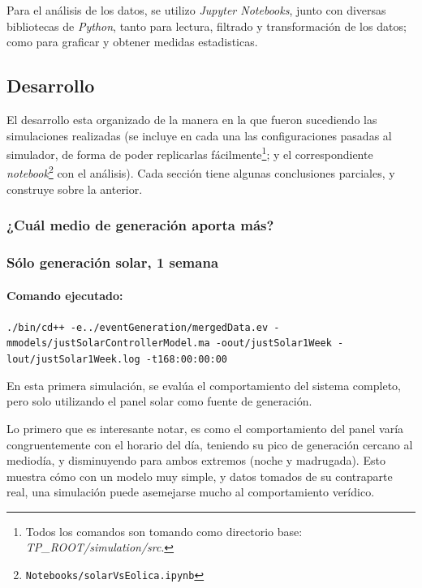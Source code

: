 Para el análisis de los datos, se utilizo \textit{Jupyter Notebooks}, junto
con diversas bibliotecas de \textit{Python}, tanto para lectura, filtrado y
transformación de los datos; como para graficar y obtener medidas
estadisticas.

\pagebreak
\subsection{Desarrollo}
El desarrollo esta organizado de la manera en la que fueron sucediendo las
simulaciones realizadas (se incluye en cada una las configuraciones pasadas
al simulador, de forma de poder replicarlas fácilmente\footnote{Todos los
comandos son tomando como directorio base:
\textit{TP\_ROOT/simulation/src}.}; y el correspondiente \textit{notebook}\footnote{\texttt{Notebooks/solarVsEolica.ipynb}}
con el análisis). Cada sección tiene algunas conclusiones parciales, y
construye sobre la anterior.

\subsubsection{¿Cuál medio de generación aporta más?}

    \hypertarget{suxf3lo-generaciuxf3n-solar-1-semana}{%
\subsubsection{Sólo generación solar, 1
semana}\label{suxf3lo-generaciuxf3n-solar-1-semana}}

\hypertarget{comando-ejecutado}{%
\paragraph{Comando ejecutado:}\label{comando-ejecutado}}

\texttt{./bin/cd++ -e../eventGeneration/mergedData.ev
-mmodels/justSolarControllerModel.ma -oout/justSolar1Week
-lout/justSolar1Week.log -t168:00:00:00}

    En esta primera simulación, se evalúa el comportamiento del sistema
completo, pero solo utilizando el panel solar como fuente de generación.

Lo primero que es interesante notar, es como el comportamiento del panel
varía congruentemente con el horario del día, teniendo su pico de
generación cercano al mediodía, y disminuyendo para ambos extremos
(noche y madrugada). Esto muestra cómo con un modelo muy simple, y datos
tomados de su contraparte real, una simulación puede asemejarse mucho al
comportamiento verídico.

